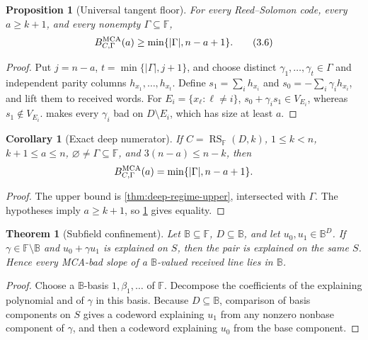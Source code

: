 \documentclass[12pt,a4paper]{amsart}
\numberwithin{equation}{section}
\newtheorem{theorem}{Theorem}[section]
\newtheorem{proposition}[proposition]{Proposition}
\newtheorem{corollary}[corollary]{Corollary}
\theoremstyle{remark}
\DeclareMathOperator{\RS}{RS}
\newcommand{\F}{\mathbb F}
\newcommand{\B}{\mathbb B}
\newcommand{\abs}[1]{\lvert #1\rvert}
\begin{document}
\begin{proposition}[Universal tangent floor]\label{prop:universal-tangent-floor}
For every Reed--Solomon code, every \(a\ge k+1\), and every nonempty
\(\Gamma\subseteq\F\),
\[
 B_{C,\Gamma}^{\rm MCA}(a)
 \ge\min\{\abs\Gamma,n-a+1\}.
 \tag{3.6}\label{eq:tangent-floor}
\]
\end{proposition}

\begin{proof}
Put \(j=n-a\), \(t=\min\{\abs\Gamma,j+1\}\), and choose distinct
\(\gamma_1,\ldots,\gamma_t\in\Gamma\) and independent parity columns
\(h_{x_1},\ldots,h_{x_t}\).  Define
\(s_1=\sum_i h_{x_i}\) and \(s_0=-\sum_i\gamma_i h_{x_i}\), and lift them
to received words.  For \(E_i=\{x_\ell:\ell\ne i\}\),
\(s_0+\gamma_i s_1\in V_{E_i}\), whereas \(s_1\notin V_{E_i}\).
 makes every \(\gamma_i\) bad on
\(D\setminus E_i\), which has size at least \(a\).
\end{proof}

\begin{corollary}[Exact deep numerator]\label{cor:exact-deep-numerator}
If \(C=\RS_\F(D,k)\), \(1\le k<n\), \(k+1\le a\le n\),
\(\varnothing\ne\Gamma\subseteq\F\), and \(3(n-a)\le n-k\), then
\[
 B_{C,\Gamma}^{\rm MCA}(a)
 =\min\{\abs\Gamma,n-a+1\}.
\]
\end{corollary}

\begin{proof}
The upper bound is \cref{thm:deep-regime-upper}, intersected with
\(\Gamma\).  The hypotheses imply \(a\ge k+1\), so
\cref{prop:universal-tangent-floor} gives equality.
\end{proof}

\begin{theorem}[Subfield confinement]\label{thm:subfield-confinement-full}
Let \(\B\subseteq\F\), \(D\subseteq\B\), and let \(u_0,u_1\in\B^D\).  If
\(\gamma\in\F\setminus\B\) and \(u_0+\gamma u_1\) is explained on \(S\),
then the pair is explained on the same \(S\).  Hence every MCA-bad slope of
a \(\B\)-valued received line lies in \(\B\).
\end{theorem}

\begin{proof}
Choose a \(\B\)-basis \(1,\beta_1,\ldots\) of \(\F\).  Decompose the
coefficients of the explaining polynomial and of \(\gamma\) in this basis.
Because \(D\subseteq\B\), comparison of basis components on \(S\) gives a
codeword explaining \(u_1\) from any nonzero nonbase component of
\(\gamma\), and then a codeword explaining \(u_0\) from the base component.
\end{proof}
\end{document}
